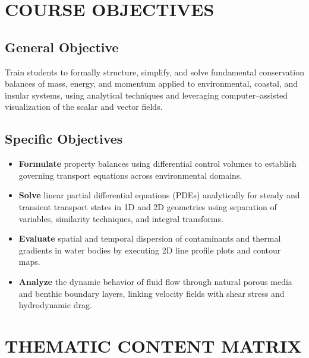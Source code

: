 \section{COURSE OBJECTIVES}

\subsection{General Objective}
Train students to formally structure, simplify, and solve fundamental conservation balances of mass, energy, and momentum applied to environmental, coastal, and insular systems, using analytical techniques and leveraging computer--assisted visualization of the scalar and vector fields.

\subsection{Specific {O}bjectives}
\begin{itemize}
    \item \textbf{Formulate} property balances using differential control volumes to establish governing transport equations across environmental domains.
    \item \textbf{Solve} linear partial differential equations (PDEs) analytically for steady and transient transport states in 1D and 2D geometries using separation of variables, similarity techniques, and integral transforms.
    \item \textbf{Evaluate} spatial and temporal dispersion of contaminants and thermal gradients in water bodies by executing 2D line profile plots and contour maps.
    \item \textbf{Analyze} the dynamic behavior of fluid flow through natural porous media and benthic boundary layers, linking velocity fields with shear stress and hydrodynamic drag.
\end{itemize}

\newpage

\section{THEMATIC CONTENT MATRIX}

